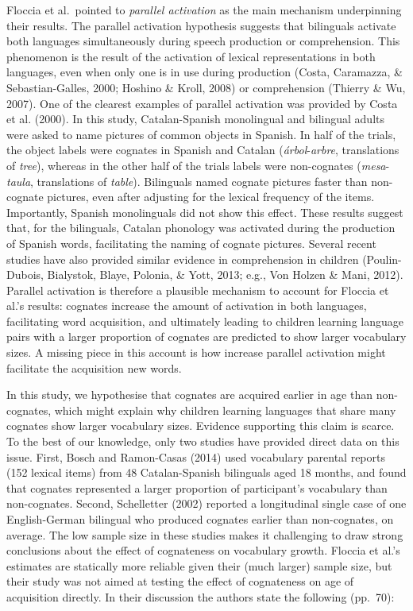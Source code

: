 \documentclass[
  english,
  man,man,floatsintext]{apa6}
\begin{document}
Floccia et al.~pointed to \emph{parallel activation} as the main mechanism underpinning their results. The parallel activation hypothesis suggests that bilinguals activate both languages simultaneously during speech production or comprehension. This phenomenon is the result of the activation of lexical representations in both languages, even when only one is in use during production (Costa, Caramazza, \& Sebastian-Galles, 2000; Hoshino \& Kroll, 2008) or comprehension (Thierry \& Wu, 2007). One of the clearest examples of parallel activation was provided by Costa et al. (2000). In this study, Catalan-Spanish monolingual and bilingual adults were asked to name pictures of common objects in Spanish. In half of the trials, the object labels were cognates in Spanish and Catalan (\emph{árbol}-\emph{arbre}, translations of \emph{tree}), whereas in the other half of the trials labels were non-cognates (\emph{mesa}-\emph{taula}, translations of \emph{table}). Bilinguals named cognate pictures faster than non-cognate pictures, even after adjusting for the lexical frequency of the items. Importantly, Spanish monolinguals did not show this effect. These results suggest that, for the bilinguals, Catalan phonology was activated during the production of Spanish words, facilitating the naming of cognate pictures. Several recent studies have also provided similar evidence in comprehension in children (Poulin-Dubois, Bialystok, Blaye, Polonia, \& Yott, 2013; e.g., Von Holzen \& Mani, 2012). Parallel activation is therefore a plausible mechanism to account for Floccia et al.'s results: cognates increase the amount of activation in both languages, facilitating word acquisition, and ultimately leading to children learning language pairs with a larger proportion of cognates are predicted to show larger vocabulary sizes. A missing piece in this account is how increase parallel activation might facilitate the acquisition new words.

In this study, we hypothesise that cognates are acquired earlier in age than non-cognates, which might explain why children learning languages that share many cognates show larger vocabulary sizes. Evidence supporting this claim is scarce. To the best of our knowledge, only two studies have provided direct data on this issue. First, Bosch and Ramon-Casas (2014) used vocabulary parental reports (152 lexical items) from 48 Catalan-Spanish bilinguals aged 18 months, and found that cognates represented a larger proportion of participant's vocabulary than non-cognates. Second, Schelletter (2002) reported a longitudinal single case of one English-German bilingual who produced cognates earlier than non-cognates, on average. The low sample size in these studies makes it challenging to draw strong conclusions about the effect of cognateness on vocabulary growth. Floccia et al.'s estimates are statically more reliable given their (much larger) sample size, but their study was not aimed at testing the effect of cognateness on age of acquisition directly. In their discussion the authors state the following (pp.~70):
\end{document}
